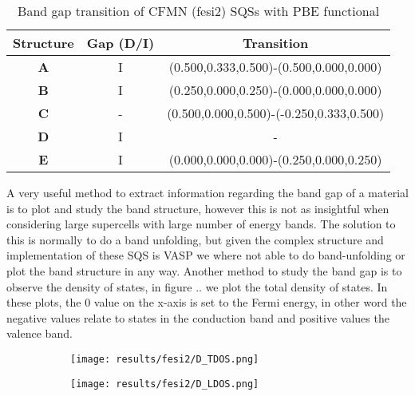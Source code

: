 \begin{table}[H]
\centering
\begin{tabular}{@{}ccc@{}}
\toprule
Structure  & Gap (D/I) & Transition                              \\ \midrule
\textbf{A} & I         & (0.500,0.333,0.500)-(0.500,0.000,0.000)  \\
\textbf{B} & I         & (0.250,0.000,0.250)-(0.000,0.000,0.000)  \\
\textbf{C} & -         & (0.500,0.000,0.500)-(-0.250,0.333,0.500) \\
\textbf{D} & I         & -                                        \\
\textbf{E} & I         & (0.000,0.000,0.000)-(0.250,0.000,0.250)  \\ \bottomrule
\end{tabular}
\caption{Band gap transition of CFMN (fesi2) SQSs with PBE functional}
\end{table}

A very useful method to extract information regarding the band gap of a material is to plot and study the band structure, however this is not as insightful when considering large supercells with large number of energy bands. The solution to this is normally to do a band unfolding, but given the complex structure and implementation of these SQS is VASP we where not able to do band-unfolding or plot the band structure in any way. Another method to study the band gap is to observe the density of states, in figure .. we plot the total density of states. In these plots, the 0 value on the x-axis is set to the Fermi energy, in other word the negative values relate to states in the conduction band and positive values the valence band. 

\begin{figure}[H]
	\centering
	\begin{subfigure}{\textwidth}
		\texttt{[image: results/fesi2/D\_TDOS.png]}
	\end{subfigure}
	\begin{subfigure}{\textwidth}
		\texttt{[image: results/fesi2/D\_LDOS.png]}
	\end{subfigure}
\end{figure}


